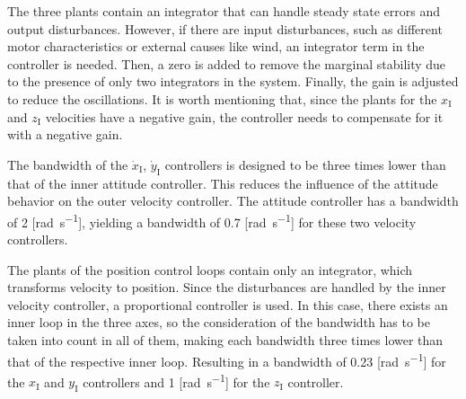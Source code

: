 
The three plants contain an integrator that can handle steady state errors and output disturbances. However, if there are input disturbances, such as different motor characteristics or external causes like wind, an integrator term in the controller is needed. Then, a zero is added to remove the marginal stability due to the presence of only two integrators in the system. Finally, the gain is adjusted to reduce the oscillations. It is worth mentioning that, since the plants for the $x_{\mathrm{I}}$ and $z_{\mathrm{I}}$ velocities have a negative gain, the controller needs to compensate for it with a negative gain.

The bandwidth of the $\dot{x}_{\mathrm{I}}$, $\dot{y}_{\mathrm{I}}$ controllers is designed to be three times lower than that of the inner attitude controller. This reduces the influence of the attitude behavior on the outer velocity controller. The attitude controller has a bandwidth of 2 [\si{rad s^{-1}}], yielding a bandwidth of 0.7 [\si{rad s^{-1}}] for these two velocity controllers.



The plants of the position control loops contain only an integrator, which transforms velocity to position. Since the disturbances are handled by the inner velocity controller, a proportional controller is used. In this case, there exists an inner loop in the three axes, so the consideration of the bandwidth has to be taken into count in all of them, making each bandwidth three times lower than that of the respective inner loop. Resulting in a bandwidth of 0.23 [\si{rad s^{-1}}] for the $x_{\mathrm{I}}$ and $y_{\mathrm{I}}$ controllers and 1 [\si{rad s^{-1}}] for the $z_{\mathrm{I}}$ controller.

